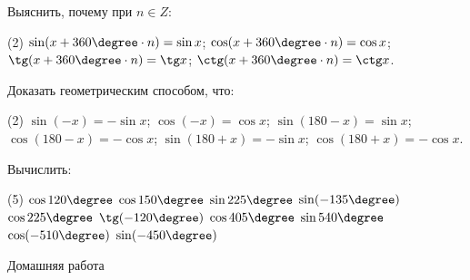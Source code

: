 \begin{class}[number=3]
	\begin{listofex}[resume]
		\item {}
		\item Выяснить, почему при \( n\in Z \):
		\begin{tasks}(2)
			\task \( \sin(x+360\degree\cdot n) = \sin x \);
			\task \( \cos(x+360\degree\cdot n) = \cos x \);
			\task \( \tg(x+360\degree\cdot n) = \tg x \);
			\task \( \ctg(x+360\degree\cdot n) = \ctg x \).
		\end{tasks}
		\item Доказать геометрическим способом, что:
		\begin{tasks}(2)
			\task \( \sin(-x) = -\sin x \);
			\task \( \cos(-x) = \cos x \);
			\task \( \sin(180 - x) = \sin x \);
			\task \( \cos(180 - x) = -\cos x \);
			\task \( \sin(180+x) = -\sin x \);
			\task \( \cos(180+x) = -\cos x \).
		\end{tasks}
		\item Вычислить:
		\begin{tasks}(5)
			\task \( \cos120\degree \)
			\task \( \cos150\degree \)
			\task \( \sin225\degree \)
			\task \( \sin(-135\degree )\)
			\task \( \cos225\degree \)
			\task \( \tg(-120\degree) \)
			\task \( \cos405\degree \)
			\task \( \sin540\degree \)
			\task \( \cos(-510\degree) \)
			\task \( \sin(-450\degree) \)
		\end{tasks}
	\end{listofex}
\end{class}

\begin{homework}[number=3]
	\begin{listofex}
		\item Домашняя работа
	\end{listofex}
\end{homework}

